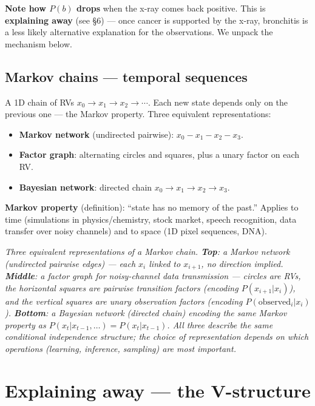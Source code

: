\documentclass[11pt, a4paper]{article}
\begin{document}
\textbf{Note how $P(b)$ drops} when the x-ray comes back positive. This is \textbf{explaining away} (see §6) — once cancer is supported by the x-ray, bronchitis is a less likely alternative explanation for the observations. We unpack the mechanism below.

\subsection{Markov chains --- temporal sequences}

A 1D chain of RVs $x_0 \to x_1 \to x_2 \to \cdots$. Each new state depends only on the previous one — the Markov property. Three equivalent representations:

\begin{itemize}
  \item \textbf{Markov network} (undirected pairwise): $x_0 - x_1 - x_2 - x_3$.
  \item \textbf{Factor graph}: alternating circles and squares, plus a unary factor on each RV.
  \item \textbf{Bayesian network}: directed chain $x_0 \to x_1 \to x_2 \to x_3$.
\end{itemize}

\textbf{Markov property} (definition): ``state has no memory of the past.'' Applies to time (simulations in physics/chemistry, stock market, speech recognition, data transfer over noisy channels) and to space (1D pixel sequences, DNA).

\begin{center}

\footnotesize\textit{Three equivalent representations of a Markov chain. \textbf{Top}: a Markov network (undirected pairwise edges) --- each $x_i$ linked to $x_{i+1}$, no direction implied. \textbf{Middle}: a factor graph for noisy-channel data transmission --- circles are RVs, the horizontal squares are pairwise transition factors (encoding $P(x_{i+1}|x_i)$), and the vertical squares are unary observation factors (encoding $P(\text{observed}_i|x_i)$). \textbf{Bottom}: a Bayesian network (directed chain) encoding the same Markov property as $P(x_t|x_{t-1},\ldots) = P(x_t|x_{t-1})$. All three describe the same conditional independence structure; the choice of representation depends on which operations (learning, inference, sampling) are most important.}
\end{center}

\section{Explaining away --- the V-structure}
\end{document}
